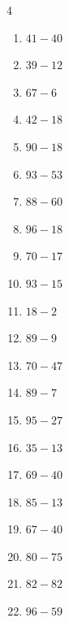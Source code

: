 \begin{multicols}{4}
\begin{enumerate}
\columnbreak %

  \item $41-40$
        \phantom{$=1$}

  \item $39-12$
        \phantom{$=27$}

  \item $67-6$
        \phantom{$=61$}

  \item $42-18$
        \phantom{$=24$}

  \item $90-18$
        \phantom{$=72$}

  \item $93-53$
        \phantom{$=40$}

  \item $88-60$
        \phantom{$=28$}

  \item $96-18$
        \phantom{$=78$}

  \item $70-17$
        \phantom{$=53$}

  \item $93-15$
        \phantom{$=78$}

  \item $18-2$
        \phantom{$=16$}

  \item $89-9$
        \phantom{$=80$}

  \item $70-47$
        \phantom{$=23$}

  \item $89-7$
        \phantom{$=82$}

  \item $95-27$
        \phantom{$=68$}

  \item $35-13$
        \phantom{$=22$}

  \item $69-40$
        \phantom{$=29$}

  \item $85-13$
        \phantom{$=72$}

  \item $67-40$
        \phantom{$=27$}

  \item $80-75$
        \phantom{$=5$}

  \item $82-82$
        \phantom{$=0$}

  \item $96-59$
        \phantom{$=37$}


\end{enumerate}
\end{multicols}
